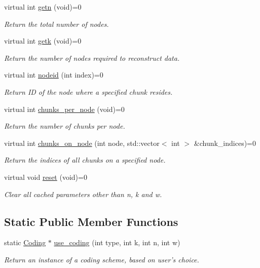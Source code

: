 \begin{DoxyCompactItemize}
virtual int \hyperlink{classCoding_a0c8cf500735e3611fc823f08a0281a03}{getn} (void)=0
\begin{DoxyCompactList}\small\item\em \-Return the total number of nodes. \end{DoxyCompactList}\item 
virtual int \hyperlink{classCoding_acf10fe78c27541ebb60a1a6e86b2e1c4}{getk} (void)=0
\begin{DoxyCompactList}\small\item\em \-Return the number of nodes required to reconstruct data. \end{DoxyCompactList}\item 
virtual int \hyperlink{classCoding_a3d77a2680d87464ab0a723bbb27640c3}{nodeid} (int index)=0
\begin{DoxyCompactList}\small\item\em \-Return \-I\-D of the node where a specified chunk resides. \end{DoxyCompactList}\item 
virtual int \hyperlink{classCoding_a36c0f012731d7cafb3e106cae210e266}{chunks\-\_\-per\-\_\-node} (void)=0
\begin{DoxyCompactList}\small\item\em \-Return the number of chunks per node. \end{DoxyCompactList}\item 
virtual int \hyperlink{classCoding_af5e4733ef43bdcc29413fba823aa9cd8}{chunks\-\_\-on\-\_\-node} (int node, std\-::vector$<$ int $>$ \&chunk\-\_\-indices)=0
\begin{DoxyCompactList}\small\item\em \-Return the indices of all chunks on a specified node. \end{DoxyCompactList}\item 
virtual void \hyperlink{classCoding_ac305bb1decbd134ce41ff3d4554740fc}{reset} (void)=0
\begin{DoxyCompactList}\small\item\em \-Clear all cached parameters other than n, k and w. \end{DoxyCompactList}\end{DoxyCompactItemize}
\subsection*{\-Static \-Public \-Member \-Functions}
\begin{DoxyCompactItemize}
\item 
static \hyperlink{classCoding}{\-Coding} $\ast$ \hyperlink{classCoding_a65e4c5811dc3893914e702218607d92e}{use\-\_\-coding} (int type, int k, int n, int w)
\begin{DoxyCompactList}\small\item\em \-Return an instance of a coding scheme, based on user's choice. \end{DoxyCompactList}\end{DoxyCompactItemize}
